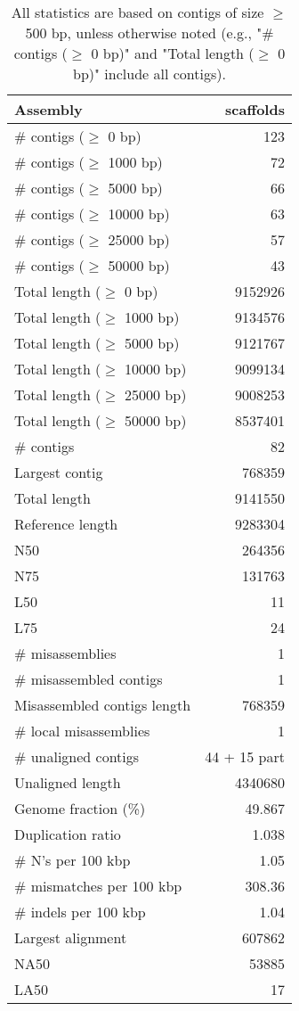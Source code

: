 \documentclass[12pt,a4paper]{article}
\begin{document}
\begin{table}[ht]
\begin{center}
\caption{All statistics are based on contigs of size $\geq$ 500 bp, unless otherwise noted (e.g., "\# contigs ($\geq$ 0 bp)" and "Total length ($\geq$ 0 bp)" include all contigs).}
\begin{tabular}{|l*{1}{|r}|}
\hline
Assembly & scaffolds \\ \hline
\# contigs ($\geq$ 0 bp) & 123 \\ \hline
\# contigs ($\geq$ 1000 bp) & 72 \\ \hline
\# contigs ($\geq$ 5000 bp) & 66 \\ \hline
\# contigs ($\geq$ 10000 bp) & 63 \\ \hline
\# contigs ($\geq$ 25000 bp) & 57 \\ \hline
\# contigs ($\geq$ 50000 bp) & 43 \\ \hline
Total length ($\geq$ 0 bp) & 9152926 \\ \hline
Total length ($\geq$ 1000 bp) & 9134576 \\ \hline
Total length ($\geq$ 5000 bp) & 9121767 \\ \hline
Total length ($\geq$ 10000 bp) & 9099134 \\ \hline
Total length ($\geq$ 25000 bp) & 9008253 \\ \hline
Total length ($\geq$ 50000 bp) & 8537401 \\ \hline
\# contigs & 82 \\ \hline
Largest contig & 768359 \\ \hline
Total length & 9141550 \\ \hline
Reference length & 9283304 \\ \hline
N50 & 264356 \\ \hline
N75 & 131763 \\ \hline
L50 & 11 \\ \hline
L75 & 24 \\ \hline
\# misassemblies & 1 \\ \hline
\# misassembled contigs & 1 \\ \hline
Misassembled contigs length & 768359 \\ \hline
\# local misassemblies & 1 \\ \hline
\# unaligned contigs & 44 + 15 part \\ \hline
Unaligned length & 4340680 \\ \hline
Genome fraction (\%) & 49.867 \\ \hline
Duplication ratio & 1.038 \\ \hline
\# N's per 100 kbp & 1.05 \\ \hline
\# mismatches per 100 kbp & 308.36 \\ \hline
\# indels per 100 kbp & 1.04 \\ \hline
Largest alignment & 607862 \\ \hline
NA50 & 53885 \\ \hline
LA50 & 17 \\ \hline
\end{tabular}
\end{center}
\end{table}
\end{document}
